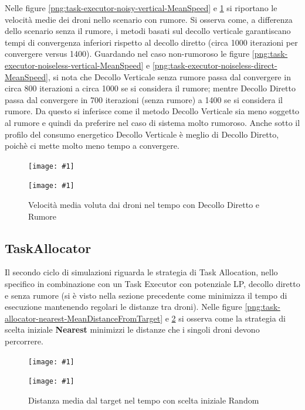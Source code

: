 \documentclass[a4paper,11pt,oneside, table]{article}
\newcommand{\putsubimage}[5] {
  \begin{minipage}{{#4}\linewidth}
	    \centering
      \texttt{[image: \#1]}
	    \caption{#2}\label{#3}
	\end{minipage}
}
\newcommand{\putimagecouple}[2] {
  \begin{figure}[!htb]
      \centering
      #1
      \hspace{0.5cm}
      #2
  \end{figure}
}
\begin{document}
Nelle figure \ref{png:task-executor-noisy-vertical-MeanSpeed} e \ref{png:task-executor-noisy-direct-MeanSpeed} si riportano le velocit\`a medie dei droni nello scenario con rumore.
Si osserva  come, a differenza dello scenario senza il rumore, i metodi basati sul decollo verticale garantiscano tempi di convergenza inferiori rispetto al decollo diretto (circa 1000 iterazioni per convergere versus 1400).
Guardando nel caso non-rumoroso le figure \ref{png:task-executor-noiseless-vertical-MeanSpeed} e \ref{png:task-executor-noiseless-direct-MeanSpeed}, si nota che Decollo Verticale senza rumore passa dal convergere in circa 800 iterazioni a circa 1000 se si considera il rumore; mentre Decollo Diretto passa dal convergere in 700 iterazioni (senza rumore) a 1400 se si considera il rumore.
Da questo si inferisce come il metodo Decollo Verticale sia meno soggetto al rumore e quindi da preferire nel caso di sistema molto rumoroso.
Anche sotto il profilo del consumo energetico Decollo Verticale è meglio di Decollo Diretto, poichè ci mette molto meno tempo a convergere.

\putimagecouple
{\putsubimage{images/experiments/task-executor-noisy-vertical/MeanSpeed.png}{Velocit\`a media voluta dai droni nel tempo con Decollo Verticale e Rumore}{png:task-executor-noisy-vertical-MeanSpeed}{0.4}{0.99}}
{\putsubimage{images/experiments/task-executor-noisy-direct/MeanSpeed.png}{Velocit\`a media voluta dai droni nel tempo con Decollo Diretto e Rumore}{png:task-executor-noisy-direct-MeanSpeed}{0.4}{0.99}}

\subsection{TaskAllocator}

Il secondo ciclo di simulazioni riguarda le strategia di Task Allocation, nello specifico in combinazione con un Task Executor con potenziale LP, decollo diretto e senza rumore (si \`e visto nella sezione precedente come minimizza il tempo di esecuzione mantenendo regolari le distanze tra droni).
Nelle figure \ref{png:task-allocator-nearest-MeanDistanceFromTarget} e \ref{png:task-allocator-random-MeanDistanceFromTarget} si osserva come la strategia di scelta iniziale \textbf{Nearest} minimizzi le distanze che i singoli droni devono percorrere.

\putimagecouple
{\putsubimage{images/experiments/task-allocator-nearest/MeanDistanceFromTarget.png}{Distanza media dal target nel tempo con scelta iniziale Nearest}{png:task-allocator-nearest-MeanDistanceFromTarget}{0.4}{0.99}}
{\putsubimage{images/experiments/task-allocator-random/MeanDistanceFromTarget.png}{Distanza media dal target nel tempo con scelta iniziale Random}{png:task-allocator-random-MeanDistanceFromTarget}{0.4}{0.99}}
\end{document}
